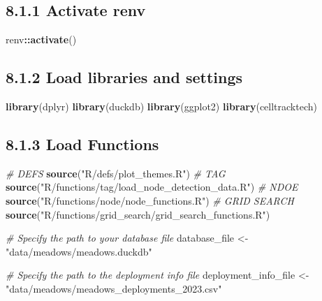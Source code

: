 \documentclass[
]{book}
\newenvironment{Shaded}{\begin{snugshade}}{\end{snugshade}}
\newcommand{\CommentTok}[1]{\textcolor[rgb]{0.56,0.35,0.01}{\textit{#1}}}
\newcommand{\FunctionTok}[1]{\textcolor[rgb]{0.13,0.29,0.53}{\textbf{#1}}}
\newcommand{\NormalTok}[1]{#1}
\newcommand{\OtherTok}[1]{\textcolor[rgb]{0.56,0.35,0.01}{#1}}
\newcommand{\SpecialCharTok}[1]{\textcolor[rgb]{0.81,0.36,0.00}{\textbf{#1}}}
\newcommand{\StringTok}[1]{\textcolor[rgb]{0.31,0.60,0.02}{#1}}
\begin{document}
\subsection{8.1.1 Activate renv}\label{activate-renv}

\begin{Shaded}
\begin{Highlighting}[]
\NormalTok{renv}\SpecialCharTok{::}\FunctionTok{activate}\NormalTok{()}
\end{Highlighting}
\end{Shaded}

\subsection{8.1.2 Load libraries and settings}\label{load-libraries-and-settings-1}

\begin{Shaded}
\begin{Highlighting}[]
\FunctionTok{library}\NormalTok{(dplyr)}
\FunctionTok{library}\NormalTok{(duckdb)}
\FunctionTok{library}\NormalTok{(ggplot2)}
\FunctionTok{library}\NormalTok{(celltracktech)}
\end{Highlighting}
\end{Shaded}

\subsection{8.1.3 Load Functions}\label{load-functions}

\begin{Shaded}
\begin{Highlighting}[]
\CommentTok{\# DEFS}
\FunctionTok{source}\NormalTok{(}\StringTok{"R/defs/plot\_themes.R"}\NormalTok{)}
\CommentTok{\# TAG}
\FunctionTok{source}\NormalTok{(}\StringTok{"R/functions/tag/load\_node\_detection\_data.R"}\NormalTok{)}
\CommentTok{\# NDOE}
\FunctionTok{source}\NormalTok{(}\StringTok{"R/functions/node/node\_functions.R"}\NormalTok{)}
\CommentTok{\# GRID SEARCH}
\FunctionTok{source}\NormalTok{(}\StringTok{"R/functions/grid\_search/grid\_search\_functions.R"}\NormalTok{)}

\CommentTok{\# Specify the path to your database file}
\NormalTok{database\_file }\OtherTok{\textless{}{-}} \StringTok{"data/meadows/meadows.duckdb"}

\CommentTok{\# Specify the path to the deployment info file}
\NormalTok{deployment\_info\_file }\OtherTok{\textless{}{-}} \StringTok{"data/meadows/meadows\_deployments\_2023.csv"}
\end{Highlighting}
\end{Shaded}
\end{document}
